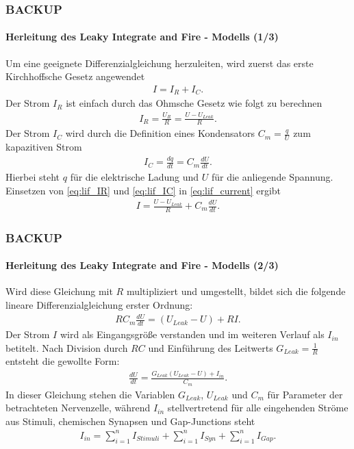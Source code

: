 \documentclass[10pt,t,aspectratio=1610]{beamer}
\newcommand{\ChapterBackup}{BACKUP}
\begin{document}
\begin{frame}

	\frametitle{\ChapterBackup}
	\framesubtitle{Herleitung des Leaky Integrate and Fire - Modells (1/3)}
	\vspace{0.3cm}
	Um eine geeignete Differenzialgleichung herzuleiten, wird zuerst das erste Kirchhoffsche Gesetz angewendet
	\begin{align}
	\label{eq:lif_current}
	I = I_R + I_C\text{.}
	\end{align}
	Der Strom $I_R$ ist einfach durch das Ohmsche Gesetz wie folgt zu berechnen
	\begin{align}
	\label{eq:lif_IR}
	I_R = \frac{U_R}{R} = \frac{U - U_{Leak}}{R}\text{.}
	\end{align}
	Der Strom $I_C$ wird durch die Definition eines Kondensators $C_m = \tfrac{q}{U}$ zum kapazitiven Strom 
	\begin{align}
	\label{eq:lif_IC}
	I_C = \frac{dq}{dt} = C_m \frac{dU}{dt}\text{.}
	\end{align}
	Hierbei steht $q$ für die elektrische Ladung und $U$ für die anliegende Spannung.\\
	Einsetzen von \eqref{eq:lif_IR} und \eqref{eq:lif_IC} in \eqref{eq:lif_current} ergibt
	\begin{align}
	\label{eq:lif_I}
	I = \frac{U - U_{Leak}}{R} + C_m\frac{dU}{dt}\text{.}
	\end{align}
\end{frame}


\begin{frame}
	\frametitle{\ChapterBackup}
	\framesubtitle{Herleitung des Leaky Integrate and Fire - Modells (2/3)}
	\vspace{0.3cm}
	Wird diese Gleichung mit $R$ multipliziert und umgestellt, bildet sich die folgende lineare Differenzialgleichung erster Ordnung:
	\begin{align}
	\label{eq:lif_nd}
	R C_m \frac{dU}{dt} = (U_{Leak} - U) + R I\text{.}
	\end{align}
	Der Strom $I$ wird als Eingangsgröße verstanden und im weiteren Verlauf als $I_{in}$ betitelt. Nach Division durch $RC$ und Einführung des Leitwerts $G_{Leak} = \tfrac{1}{R}$ entsteht die gewollte Form:
	\begin{align}
	\label{eq:lif}
	\frac{dU}{dt} = \frac{G_{Leak}(U_{Leak} - U) + I_{in}}{C_m}\text{.}
	\end{align}
	In dieser Gleichung stehen die Variablen $G_{Leak}$, $U_{Leak}$ und $C_m$ für Parameter der betrachteten Nervenzelle, während $I_{in}$ stellvertretend für alle eingehenden Ströme aus Stimuli, chemischen Synapsen und Gap-Junctions steht
	\begin{align}
	\label{eq:lif_current_in}
	I_{in} = \sum_{i = 1}^{n}{I_{Stimuli}} + \sum_{i = 1}^{n}{I_{Syn}} + \sum_{i = 1}^{n}{I_{Gap}}\text{.}
	\end{align}
\end{frame}
\end{document}
